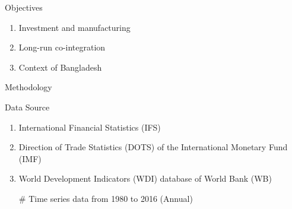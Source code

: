 \documentclass{beamer}
\begin{document}
\begin{frame} {Objectives}

\begin{enumerate}
\Large \item{Investment and manufacturing}
\Large \item{Long-run co-integration}
\Large \item{Context of Bangladesh}
\end{enumerate}

\end{frame}





\begin{frame} {Methodology}

\end{frame}




\begin{frame} {Data Source}
\begin{enumerate}
 \Large \item {International Financial Statistics (IFS)}
\Large \item {Direction of Trade Statistics (DOTS) of the International Monetary Fund (IMF)}
\Large \item{World Development Indicators (WDI) database of World Bank (WB)}
\item [\#] \Large {Time series data from 1980 to 2016 (Annual)}
\end{enumerate}
\end{frame}
\end{document}
